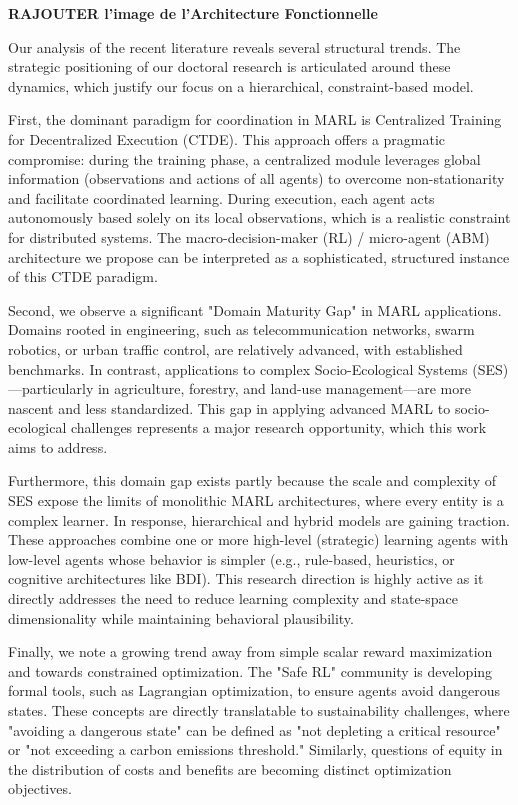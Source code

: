 \documentclass[conference]{IEEEtran}
\begin{document}
\textbf{RAJOUTER l'image de l'Architecture Fonctionnelle}

Our analysis of the recent literature reveals several structural trends. The strategic positioning of our doctoral research is articulated around these dynamics, which justify our focus on a hierarchical, constraint-based model.

First, the dominant paradigm for coordination in MARL is Centralized Training for Decentralized Execution (CTDE). This approach offers a pragmatic compromise: during the training phase, a centralized module leverages global information (observations and actions of all agents) to overcome non-stationarity and facilitate coordinated learning. During execution, each agent acts autonomously based solely on its local observations, which is a realistic constraint for distributed systems. The macro-decision-maker (RL) / micro-agent (ABM) architecture we propose can be interpreted as a sophisticated, structured instance of this CTDE paradigm.

Second, we observe a significant "Domain Maturity Gap" in MARL applications. Domains rooted in engineering, such as telecommunication networks, swarm robotics, or urban traffic control, are relatively advanced, with established benchmarks. In contrast, applications to complex Socio-Ecological Systems (SES)---particularly in agriculture, forestry, and land-use management---are more nascent and less standardized. This gap in applying advanced MARL to socio-ecological challenges represents a major research opportunity, which this work aims to address.

Furthermore, this domain gap exists partly because the scale and complexity of SES expose the limits of monolithic MARL architectures, where every entity is a complex learner. In response, hierarchical and hybrid models are gaining traction. These approaches combine one or more high-level (strategic) learning agents with low-level agents whose behavior is simpler (e.g., rule-based, heuristics, or cognitive architectures like BDI). This research direction is highly active as it directly addresses the need to reduce learning complexity and state-space dimensionality while maintaining behavioral plausibility.

Finally, we note a growing trend away from simple scalar reward maximization and towards constrained optimization. The "Safe RL" community is developing formal tools, such as Lagrangian optimization, to ensure agents avoid dangerous states. These concepts are directly translatable to sustainability challenges, where "avoiding a dangerous state" can be defined as "not depleting a critical resource" or "not exceeding a carbon emissions threshold." Similarly, questions of equity in the distribution of costs and benefits are becoming distinct optimization objectives.
\end{document}

